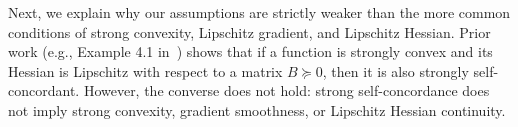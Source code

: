 \documentclass[11pt,letterpaper]{article}
\newcommand\0{{\Vector{0}}}
\newcommand\1{{\Vector{1}}}
\numberwithin{assumption}{section}
\numberwithin{definition}{section}
\numberwithin{theorem}{section}
\numberwithin{remark}{section}
\begin{document}
Next, we explain why our assumptions are strictly weaker than the more common conditions of strong convexity, Lipschitz gradient, and Lipschitz Hessian. Prior work (e.g., Example 4.1 in~\cite{rodomanov2020greedy}) shows that if a function is strongly convex and its Hessian is Lipschitz with respect to a matrix $B \succeq 0$, then it is also strongly self-concordant. However, the converse does not hold: strong self-concordance does not imply strong convexity, gradient smoothness, or Lipschitz Hessian continuity.



\end{document}
